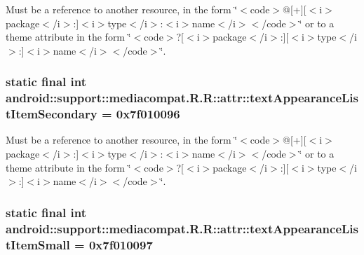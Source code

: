 Must be a reference to another resource, in the form \char`\"{}$<$code$>$@\mbox{[}+\mbox{]}\mbox{[}$<$i$>$package$<$/i$>$:\mbox{]}$<$i$>$type$<$/i$>$:$<$i$>$name$<$/i$>$$<$/code$>$\char`\"{} or to a theme attribute in the form \char`\"{}$<$code$>$?\mbox{[}$<$i$>$package$<$/i$>$:\mbox{]}\mbox{[}$<$i$>$type$<$/i$>$:\mbox{]}$<$i$>$name$<$/i$>$$<$/code$>$\char`\"{}. \hypertarget{classandroid_1_1support_1_1mediacompat_1_1_r_1_1attr_c9e2e9a7f6325be67c020c95bbdfb06f}{
\subsubsection[{textAppearanceListItemSecondary}]{\setlength{\rightskip}{0pt plus 5cm}static final int android::support::mediacompat.R.R::attr::textAppearanceListItemSecondary = 0x7f010096}}
\label{classandroid_1_1support_1_1mediacompat_1_1_r_1_1attr_c9e2e9a7f6325be67c020c95bbdfb06f}


Must be a reference to another resource, in the form \char`\"{}$<$code$>$@\mbox{[}+\mbox{]}\mbox{[}$<$i$>$package$<$/i$>$:\mbox{]}$<$i$>$type$<$/i$>$:$<$i$>$name$<$/i$>$$<$/code$>$\char`\"{} or to a theme attribute in the form \char`\"{}$<$code$>$?\mbox{[}$<$i$>$package$<$/i$>$:\mbox{]}\mbox{[}$<$i$>$type$<$/i$>$:\mbox{]}$<$i$>$name$<$/i$>$$<$/code$>$\char`\"{}. \hypertarget{classandroid_1_1support_1_1mediacompat_1_1_r_1_1attr_b69e46f611f484d85fa835213aed6a15}{
\subsubsection[{textAppearanceListItemSmall}]{\setlength{\rightskip}{0pt plus 5cm}static final int android::support::mediacompat.R.R::attr::textAppearanceListItemSmall = 0x7f010097}}
\label{classandroid_1_1support_1_1mediacompat_1_1_r_1_1attr_b69e46f611f484d85fa835213aed6a15}


